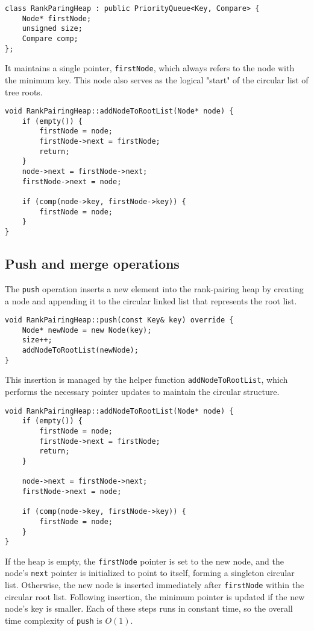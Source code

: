 \begin{verbatim}
class RankParingHeap : public PriorityQueue<Key, Compare> {
    Node* firstNode;
    unsigned size;
    Compare comp;
};
\end{verbatim}

It maintains a single pointer, \texttt{firstNode}, which always refers to the node with the minimum key. This node also serves as the logical "start" of the circular list of tree roots.

\begin{verbatim}
void RankPairingHeap::addNodeToRootList(Node* node) {
    if (empty()) {
        firstNode = node;
        firstNode->next = firstNode;
        return;
    }
    node->next = firstNode->next;
    firstNode->next = node;

    if (comp(node->key, firstNode->key)) {
        firstNode = node;
    }
}
\end{verbatim}

\subsection{Push and merge operations}

The \texttt{push} operation inserts a new element into the rank-pairing heap by creating a node and appending it to the circular linked list that represents the root list.

\begin{verbatim}
void RankPairingHeap::push(const Key& key) override {
    Node* newNode = new Node(key);
    size++;
    addNodeToRootList(newNode);
}
\end{verbatim}

This insertion is managed by the helper function \texttt{addNodeToRootList}, which performs the necessary pointer updates to maintain the circular structure.

\begin{verbatim}
void RankPairingHeap::addNodeToRootList(Node* node) {
    if (empty()) {
        firstNode = node;
        firstNode->next = firstNode;
        return;
    }
    
    node->next = firstNode->next;
    firstNode->next = node;
    
    if (comp(node->key, firstNode->key)) {
        firstNode = node;
    }
}
\end{verbatim}

If the heap is empty, the \texttt{firstNode} pointer is set to the new node, and the node's \texttt{next} pointer is initialized to point to itself, forming a singleton circular list. Otherwise, the new node is inserted immediately after \texttt{firstNode} within the circular root list. Following insertion, the minimum pointer is updated if the new node's key is smaller. Each of these steps runs in constant time, so the overall time complexity of \texttt{push} is \(O(1)\).

